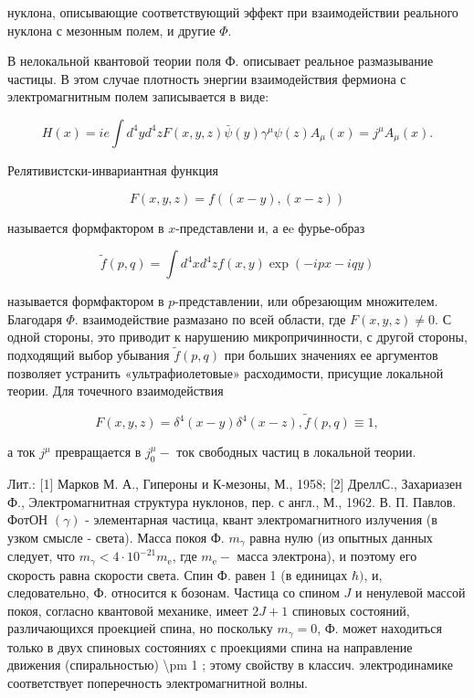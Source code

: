 \documentclass[10pt]{article}
\begin{document}
нуклона, описывающие соответствующий эффект при взаимодействии реального нуклона с мезонным полем, и другие $\Phi$.



В нелокальной квантовой теории поля Ф. описывает реальное размазывание частицы. В этом случае плотность энергии взаимодействия фермиона с электромагнитным полем записывается в виде:



\[

H(x)=i e \int d^{4} y d^{4} z F(x, y, z) \bar{\psi}(y) \gamma^{\mu} \psi(z) A_{\mu}(x)=j^{\mu} A_{\mu}(x) .

\]



Релятивистски-инвариантная функция



\[

F(x, y, z)=f((x-y),(x-z))

\]



называется формфактором в $x$-представлени и, а еe фурье-образ



\[

\tilde{f}(p, q)=\int d^{4} x d^{4} z f(x, y) \exp (-i p x-i q y)

\]



называется формфактором в $p$-представлении, или обрезающим множителем. Благодаря $\Phi$. взаимодействие размазано по всей области, где $F(x, y, z) \neq 0$. С одной стороны, это приводит к нарушению микропричинности, с другой стороны, подходящий выбор убывания $\tilde{f}(p, q)$ при больших значениях ее аргументов позволяет устранить «ультрафиолетовые» расходимости, присущие локальной теории. Для точечного взаимодействия



\[

F(x, y, z)=\delta^{4}(x-y) \delta^{4}(x-z), \tilde{f}(p, q) \equiv 1,

\]



а ток $j^{\mu}$ превращается в $j_{0}^{\mu}-$ ток свободных частиц в локальной теории.



Лит.: [1] Марков М. А., Гипероны и К-мезоны, М., 1958; [2] ДреллС., Захариазен Ф., Электромагнитная структура нуклонов, пер. с англ., М., 1962. В. П. Павлов. ФотОН $(\gamma)$ - элементарная частица, квант электромагнитного излучения (в узком смысле - света). Масса покоя Ф. $m_{\gamma}$ равна нулю (из опытных данных следует, что $m_{\gamma}<4 \cdot 10^{-21} m_{\mathrm{e}}$, где $m_{\mathrm{e}}-$ масса электрона), и поэтому его скорость равна скорости света. Спин Ф. равен 1 (в единицах $\hbar)$, и, следовательно, Ф. относится к бозонам. Частица со спином $J$ и ненулевой массой покоя, согласно квантовой механике, имеет $2 J+1$ спиновых состояний, различающихся проекцией спина, но поскольку $m_{\gamma}=0$, Ф. может находиться только в двух спиновых состояниях с проекциями спина на направление движения (спиральностью) \textbackslash pm 1 ; этому свойству в классич. электродинамике соответствует поперечность электромагнитной волны.
\end{document}
